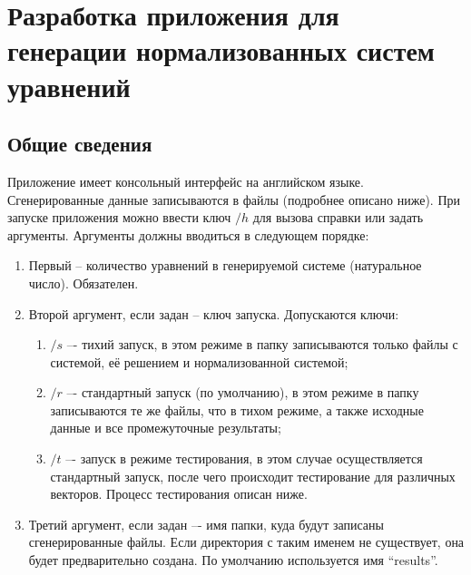 \chapter{Разработка приложения для генерации нормализованных систем уравнений} \label{ch2}
	
\section{Общие сведения} \label{ch2:intro}

Приложение имеет консольный интерфейс на английском языке. Сгенерированные данные записываются в файлы (подробнее описано ниже). При запуске приложения можно ввести ключ \(/h\) для вызова справки или задать аргументы. Аргументы должны вводиться в следующем порядке:
\begin{enumerate}
	\item Первый – количество уравнений в генерируемой системе (натуральное число). Обязателен.
	\item Второй аргумент, если задан – ключ запуска. Допускаются ключи:
	\begin{enumerate}
		\item \(/s\) –- тихий запуск, в этом режиме в папку записываются только файлы с системой, её решением и нормализованной системой;
		\item \(/r\) –- стандартный запуск (по умолчанию), в этом режиме в папку записываются те же файлы, что в тихом режиме, а также исходные данные и все промежуточные результаты;
		\item \(/t\) –- запуск в режиме тестирования, в этом случае осуществляется стандартный запуск, после чего происходит тестирование для различных векторов. Процесс тестирования описан ниже.
	\end{enumerate} 
	\item Третий аргумент, если задан –- имя папки, куда будут записаны сгенерированные файлы. Если директория с таким именем не существует, она будет предварительно создана. По умолчанию используется имя “results”.
\end{enumerate} 

